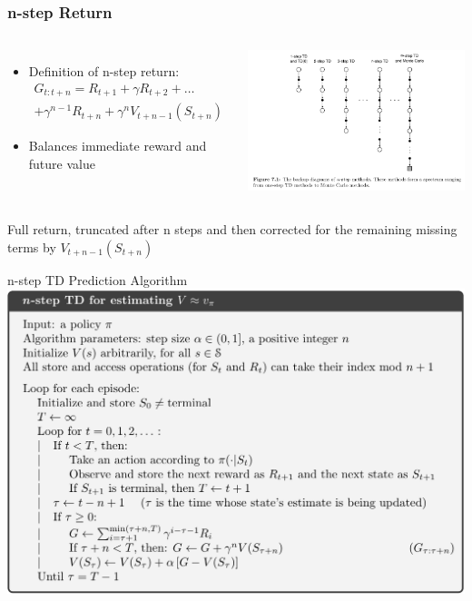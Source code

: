 \documentclass{beamer}
\begin{document}
    \begin{frame}
        \frametitle{n-step Return}
        \begin{columns}
            \begin{itemize}
                \item Definition of n-step return:
                \begin{multline*}
                    G_{t:t+n} = R_{t+1} + \gamma R_{t+2} + \ldots \\
                    + \gamma^{n-1} R_{t+n} + \gamma^n V_{t+n-1}(S_{t+n})
                \end{multline*}
                \item Balances immediate reward and future value
            \end{itemize}
            \includegraphics[width=\textwidth]{n-step-return.png}
        \end{columns}
\vspace{20pt}
        Full return, truncated after n steps and then corrected for the
remaining missing terms by $V_{t+n-1}(S_{t+n})$
    \end{frame}

    \begin{frame}{n-step TD Prediction Algorithm}
        \includegraphics[width=\textwidth]{n-step-td-prediction-alg.png}
     \end{frame}
\end{document}
